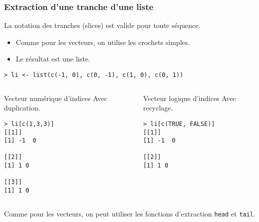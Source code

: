 \documentclass[10pt]{beamer}
\begin{document}
\begin{frame}[fragile]
  \frametitle{Extraction d'une tranche d'une liste}
  La notation des tranches (\alert{slices}) est valide pour toute séquence. \\
  \begin{itemize}
  \item Comme pour les vecteurs, on utilise les \alert{crochets simples}.
  \item Le résultat est une liste.
  \end{itemize}

    \begin{lstlisting}
> li <- list(c(-1, 0), c(0, -1), c(1, 0), c(0, 1))
\end{lstlisting}

\vspace{-15pt}
\begin{columns}[t]
\begin{column}{0.48\textwidth}
  \begin{exampleblock}{Vecteur numérique d’indices}
    Avec duplication.
    \begin{lstlisting}
> li[c(1,3,3)]
[[1]]
[1] -1  0

[[2]]
[1] 1 0

[[3]]
[1] 1 0
\end{lstlisting}
  \end{exampleblock}
\end{column}
\begin{column}{0.48\textwidth}
  \begin{exampleblock}{Vecteur logique d’indices}
    Avec recyclage.
    \begin{lstlisting}
> li[c(TRUE, FALSE)]
[[1]]
[1] -1  0

[[2]]
[1] 1 0
\end{lstlisting}
  \end{exampleblock}

\end{column}
\end{columns}
Comme pour les vecteurs, on peut utiliser les fonctions d'extraction \texttt{head} et \texttt{tail}.


\end{frame}
\end{document}
